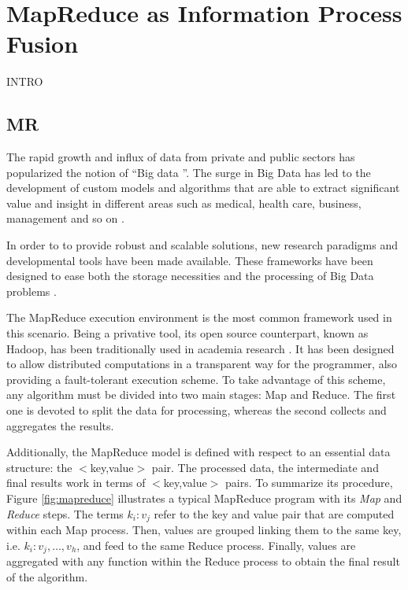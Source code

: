 \documentclass[3p,review]{elsarticle}
\begin{document}
\section{MapReduce as Information Process Fusion}\label{sec:mr}

INTRO

\subsection{MR}\label{subsec:mr}

The rapid growth and influx of data from private and public sectors has popularized the notion of ``Big data \cite{Fer14}''. The surge in Big Data has led to the development of custom models and algorithms that are able to extract significant value and insight in different areas such as medical, health care, business, management and so on \cite{Kam14,Chen14,Wu14}.

In order to to provide robust and scalable solutions, new research paradigms and developmental tools have been made available. These frameworks have been designed to ease both the storage necessities and the processing of Big Data problems \cite{Fer14}. 

The MapReduce execution environment \cite{Dea08} is the most common framework used in this scenario. Being a privative tool, its open source counterpart, known as Hadoop, has been traditionally used in academia research \cite{Whi15-Hadoop}. It has been designed to allow distributed computations in a transparent way for the programmer, also providing a fault-tolerant execution scheme. To take advantage of this scheme, any algorithm must be divided into two main stages: Map and Reduce. The first one is devoted to split the data for processing, whereas the second collects and aggregates the results.

Additionally, the MapReduce model is defined with respect to an essential data structure: the $<$key,value$>$ pair. The processed data, the intermediate and final results work in terms of $<$key,value$>$ pairs. To summarize its procedure, Figure \ref{fig:mapreduce} illustrates a typical MapReduce program with its \textit{Map} and \textit{Reduce} steps. The terms $k_i:v_j$ refer to the key and value pair that are computed within each Map process. Then, values are grouped linking them to the same key, i.e. $k_i:v_j,\ldots, v_h$, and feed to the same Reduce process. Finally, values are aggregated with any function within the Reduce process to obtain the final result of the algorithm.
\end{document}
